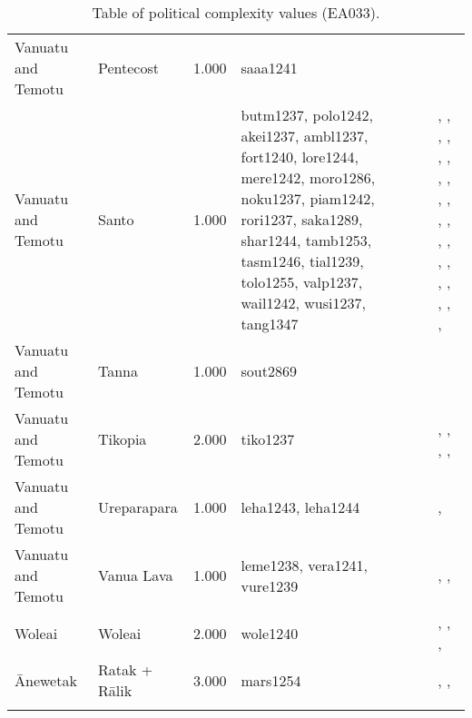 \begin{longtable}{p{1.8cm}p{1.8cm}p{1.8cm}p{2cm}p{7cm}}
  Vanuatu and Temotu & Pentecost & 1.000 & saaa1241 & \citet{lane1956} \\ 
  Vanuatu and Temotu & Santo & 1.000 & butm1237, polo1242, akei1237, ambl1237, fort1240, lore1244, mere1242, moro1286, noku1237, piam1242, rori1237, saka1289, shar1244, tamb1253, tasm1246, tial1239, tolo1255, valp1237, wail1242, wusi1237, tang1347 & \citet{bonnemaison1996power}, \citet{bonnemaison1996power}, \citet{bonnemaison1996power}, \citet{bonnemaison1996power}, \citet{bonnemaison1996power}, \citet{bonnemaison1996power}, \citet{bonnemaison1996power}, \citet{bonnemaison1996power}, \citet{bonnemaison1996power}, \citet{bonnemaison1996power}, \citet{bonnemaison1996power}, \citet{bonnemaison1996power}, \citet{bonnemaison1996power}, \citet{bonnemaison1996power}, \citet{bonnemaison1996power}, \citet{bonnemaison1996power}, \citet{bonnemaison1996power}, \citet{bonnemaison1996power}, \citet{bonnemaison1996power}, \citet{bonnemaison1996power}, \citet{bonnemaison1996power}, \citet{bonnemaison1996power} \\ 
  Vanuatu and Temotu & Tanna & 1.000 & sout2869 & \citet{lindstroem1991} \\ 
  Vanuatu and Temotu & Tikopia & 2.000 & tiko1237 & \citet{kirch1994wet}, \citet{sahlins1958social}, \citet{firth1939primitive}, \citet{firth1959social}, \citet{firth1991} \\ 
  Vanuatu and Temotu & Ureparapara & 1.000 & leha1243, leha1244 & \citet{bonnemaison1996power}, \citet{bonnemaison1996power} \\ 
  Vanuatu and Temotu & Vanua Lava & 1.000 & leme1238, vera1241, vure1239 & \citet{bonnemaison1996power}, \citet{bonnemaison1996power}, \citet{bonnemaison1996power} \\ 
  Woleai & Woleai & 2.000 & wole1240 & \citet{alkire1991woleai}, \citet{alkire1991woleai}, \citet{burrowsandspiro1953}, \citet{burrowsandspiro1953} \\ 
  Ānewetak & Ratak + Rālik & 3.000 & mars1254 & \citet{carruci1991marshall}, \citet{erdland1914}, \citet{williamson_1982} \\ 
   \bottomrule
\caption{Table of political complexity values (EA033).} 
\label{appendix_pol_complex_xtable}
\end{longtable}
